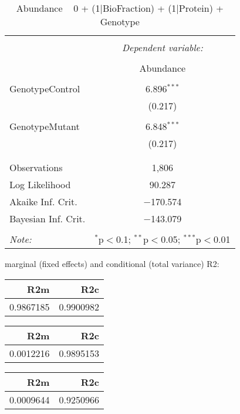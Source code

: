 \documentclass[11pt]{report}
\begin{document}
\begin{table}[!htbp] \centering 
  \caption{Abundance ~ 0 + (1|BioFraction) + (1|Protein) + Genotype} 
  \label{} 
\begin{tabular}{@{\extracolsep{5pt}}lc} 
\\[-1.8ex]\hline 
\hline \\[-1.8ex] 
 & \multicolumn{1}{c}{\textit{Dependent variable:}} \\ 
\cline{2-2} 
\\[-1.8ex] & Abundance \\ 
\hline \\[-1.8ex] 
 GenotypeControl & 6.896$^{***}$ \\ 
  & (0.217) \\ 
  & \\ 
 GenotypeMutant & 6.848$^{***}$ \\ 
  & (0.217) \\ 
  & \\ 
\hline \\[-1.8ex] 
Observations & 1,806 \\ 
Log Likelihood & 90.287 \\ 
Akaike Inf. Crit. & $-$170.574 \\ 
Bayesian Inf. Crit. & $-$143.079 \\ 
\hline 
\hline \\[-1.8ex] 
\textit{Note:}  & \multicolumn{1}{r}{$^{*}$p$<$0.1; $^{**}$p$<$0.05; $^{***}$p$<$0.01} \\ 
\end{tabular} 
\end{table} 
marginal (fixed effects) and conditional (total variance) R2:

\begin{tabular}{r|r}
\hline
R2m & R2c\\
\hline
0.9867185 & 0.9900982\\
\hline
\end{tabular}

\begin{tabular}{r|r}
\hline
R2m & R2c\\
\hline
0.0012216 & 0.9895153\\
\hline
\end{tabular}

\begin{tabular}{r|r}
\hline
R2m & R2c\\
\hline
0.0009644 & 0.9250966\\
\hline
\end{tabular}
\end{document}
